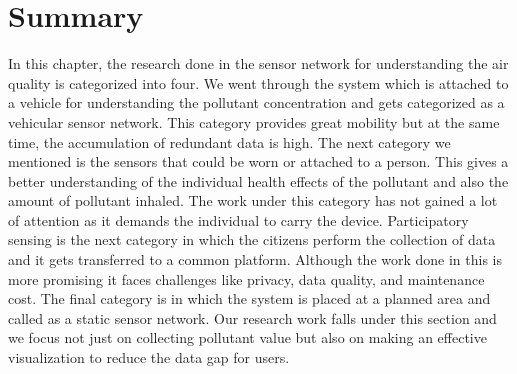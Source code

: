  \section{Summary}

 In this chapter, the research done in the sensor network for understanding the air quality is categorized into four. We went through the system which is attached to a vehicle for understanding the pollutant concentration and gets categorized as a vehicular sensor network. This category provides great mobility but at the same time, the accumulation of redundant data is high.
 The next category we mentioned is the sensors that could be worn or attached to a person. This gives a better understanding of the individual health effects of the pollutant and also the amount of pollutant inhaled. The work under this category has not gained a lot of attention as it demands the individual to carry the device. 
Participatory sensing is the next category in which the citizens perform the collection of data and it gets transferred to a common platform. Although the work done in this is more promising it faces challenges like privacy, data quality, and maintenance cost. The final category is in which the system is placed at a planned area and called as a static sensor network. Our research work falls under this section and we focus not just on collecting pollutant value but also on making an effective visualization to reduce the data gap for users.